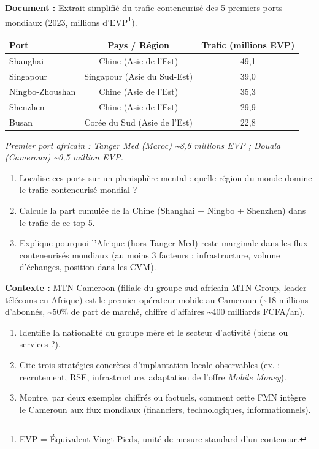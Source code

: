 \documentclass[11pt]{article}
\begin{document}
\begin{exercice}
\textbf{Document :} Extrait simplifié du trafic conteneurisé des 5 premiers ports mondiaux (2023, millions d'EVP\footnote{EVP = Équivalent Vingt Pieds, unité de mesure standard d'un conteneur.}).
\begin{center}
\begin{tabular}{|l|c|c|}\hline
\textbf{Port} & \textbf{Pays / Région} & \textbf{Trafic (millions EVP)} \\ \hline
Shanghai & Chine (Asie de l'Est) & 49,1 \\ \hline
Singapour & Singapour (Asie du Sud-Est) & 39,0 \\ \hline
Ningbo-Zhoushan & Chine (Asie de l'Est) & 35,3 \\ \hline
Shenzhen & Chine (Asie de l'Est) & 29,9 \\ \hline
Busan & Corée du Sud (Asie de l'Est) & 22,8 \\ \hline
\end{tabular}
\end{center}
\textit{Premier port africain : Tanger Med (Maroc) \textasciitilde 8,6 millions EVP ; Douala (Cameroun) \textasciitilde 0,5 million EVP.}
\begin{enumerate}
    \item Localise ces ports sur un planisphère mental : quelle région du monde domine le trafic conteneurisé mondial ?
    \item Calcule la part cumulée de la Chine (Shanghai + Ningbo + Shenzhen) dans le trafic de ce top 5.
    \item Explique pourquoi l'Afrique (hors Tanger Med) reste marginale dans les flux conteneurisés mondiaux (au moins 3 facteurs : infrastructure, volume d'échanges, position dans les CVM).
\end{enumerate}
\end{exercice}

\begin{exercice}
\textbf{Contexte :} MTN Cameroon (filiale du groupe sud-africain MTN Group, leader télécoms en Afrique) est le premier opérateur mobile au Cameroun (\textasciitilde 18 millions d'abonnés, \textasciitilde 50\% de part de marché, chiffre d'affaires \textasciitilde 400 milliards FCFA/an).
\begin{enumerate}
    \item Identifie la nationalité du groupe mère et le secteur d'activité (biens ou services ?).
    \item Cite trois stratégies concrètes d'implantation locale observables (ex. : recrutement, RSE, infrastructure, adaptation de l'offre \emph{Mobile Money}).
    \item Montre, par deux exemples chiffrés ou factuels, comment cette FMN intègre le Cameroun aux flux mondiaux (financiers, technologiques, informationnels).
\end{enumerate}
\end{exercice}
\end{document}
